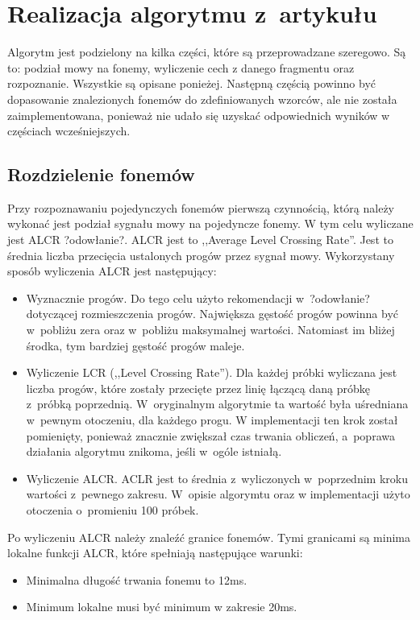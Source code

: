 \chapter{Realizacja algorytmu z~artykułu}
\label{cha:nieudane}

Algorytm jest podzielony na kilka części, które są przeprowadzane szeregowo. Są to: podział mowy na fonemy, wyliczenie cech z danego fragmentu oraz rozpoznanie. Wszystkie są opisane ponieżej. Następną częścią powinno być dopasowanie znalezionych fonemów do zdefiniowanych wzorców, ale nie została zaimplementowana, ponieważ nie udało się uzyskać odpowiednich wyników w częściach wcześniejszych.

\section{Rozdzielenie fonemów}
\label{sec:rozdzielenie}

Przy rozpoznawaniu pojedynczych fonemów pierwszą czynnością, którą należy wykonać jest podział sygnału mowy na pojedyncze fonemy. W tym celu wyliczane jest ALCR ?odowłanie?. ALCR jest to ,,Average Level Crossing Rate''. Jest to średnia liczba przecięcia ustalonych progów przez sygnał mowy. Wykorzystany sposób wyliczenia ALCR jest następujący:

\begin{itemize}
    \item Wyznacznie progów. Do tego celu użyto rekomendacji w~?odowłanie? dotyczącej rozmieszczenia progów. Największa gęstość progów powinna być w~pobliżu zera oraz w~pobliżu maksymalnej wartości. Natomiast im bliżej środka, tym bardziej gęstość progów maleje.
    \item Wyliczenie LCR (,,Level Crossing Rate''). Dla każdej próbki wyliczana jest liczba progów, które zostały przecięte przez linię łączącą daną próbkę z~próbką poprzednią. W~oryginalnym algorytmie ta wartość była uśredniana w~pewnym otoczeniu, dla każdego progu. W implementacji ten krok został pomienięty, ponieważ znacznie zwiększał czas trwania obliczeń, a~poprawa działania algorytmu znikoma, jeśli w~ogóle istniałą.
    \item Wyliczenie ALCR. ACLR jest to średnia z~wyliczonych w~poprzednim kroku wartości z~pewnego zakresu. W~opisie algorymtu oraz w implementacji użyto otoczenia o~promieniu 100 próbek.
\end{itemize}

Po wyliczeniu ALCR należy znaleźć granice fonemów. Tymi granicami są minima lokalne funkcji ALCR, które spełniają następujące warunki:
\begin{itemize}
    \item Minimalna długość trwania fonemu to 12ms.
    \item Minimum lokalne musi być minimum w zakresie 20ms.
\end{itemize}

